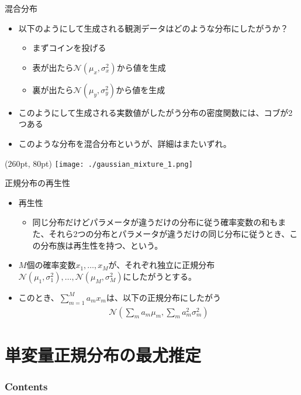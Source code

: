 \documentclass[aspectratio=169,unicode,dvipdfmx,14pt]{beamer}
\begin{document}
\begin{frame}{混合分布}
\begin{itemize}
\item 以下のようにして生成される観測データはどのような分布にしたがうか？
\begin{itemize}
\item まずコインを投げる
\item 表が出たら$\mathcal{N}(\mu_x,\sigma_x^2)$から値を生成
\item 裏が出たら$\mathcal{N}(\mu_y,\sigma_y^2)$から値を生成
\end{itemize}
\item このようにして生成される実数値がしたがう分布の密度関数には、コブが2つある
\item このような分布を混合分布というが、詳細はまたいずれ。
\end{itemize}
\begin{textblock*}{0.4\linewidth}(260pt, 80pt)
    \centering
    \texttt{[image: ./gaussian\_mixture\_1.png]}
\end{textblock*}
\end{frame}



\begin{frame}{正規分布の再生性}
\begin{itemize}
\item 再生性
\begin{itemize}
\item 同じ分布だけどパラメータが違うだけの分布に従う確率変数の和もまた、それら2つの分布とパラメータが違うだけの同じ分布に従うとき、この分布族は再生性を持つ、という。
\end{itemize}
\item $M$個の確率変数$x_1,\ldots,x_M$が、それぞれ独立に正規分布$\mathcal{N}(\mu_1,\sigma_1^2), 
\ldots, \mathcal{N}(\mu_M,\sigma_M^2)$にしたがうとする。
\item このとき、$\sum_{m=1}^M a_m x_m$は、以下の正規分布にしたがう
\begin{align}
\mathcal{N}(\sum_m a_m \mu_m, \sum_m a_m^2 \sigma_m^2)
\end{align}
\end{itemize}
\end{frame}

\section{単変量正規分布の最尤推定}

\begin{frame}\frametitle{Contents}
\Large \tableofcontents[currentsection]
\end{frame}
\end{document}
